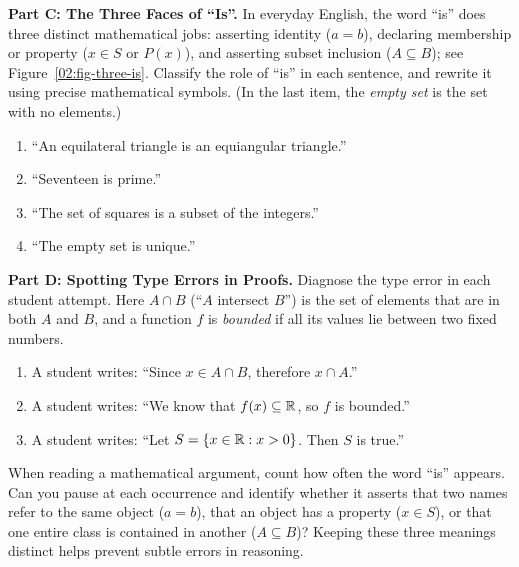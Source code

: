 \textbf{Part C: The Three Faces of ``Is''.} In everyday English, the word ``is'' does three distinct mathematical jobs: asserting identity ($a = b$), declaring membership or property ($x \in S$ or $P(x)$), and asserting subset inclusion ($A \subseteq B$); see Figure~\ref{02:fig-three-is}. Classify the role of ``is'' in each sentence, and rewrite it using precise mathematical symbols. (In the last item, the \emph{empty set} is the set with no elements.)
\begin{enumerate}[resume]
\item ``An equilateral triangle is an equiangular triangle.''
\item ``Seventeen is prime.''
\item ``The set of squares is a subset of the integers.''
\item ``The empty set is unique.''
\end{enumerate}

\textbf{Part D: Spotting Type Errors in Proofs.} Diagnose the type error in each student attempt. Here $A \cap B$ (``$A$ intersect $B$'') is the set of elements that are in both $A$ and $B$, and a function $f$ is \emph{bounded} if all its values lie between two fixed numbers.
\begin{enumerate}[resume]
\item A student writes: ``Since $x \in A \cap B$, therefore $x \cap A$.''
\item A student writes: ``We know that $f(x) \subseteq \mathbb{R}$, so $f$ is bounded.''
\item A student writes: ``Let $S = \{x \in \mathbb{R} : x > 0\}$. Then $S$ is true.''
\end{enumerate}

\begin{walkbox}
When reading a mathematical argument, count how often the word ``is'' appears. Can you pause at each occurrence and identify whether it asserts that two names refer to the same object ($a = b$), that an object has a property ($x \in S$), or that one entire class is contained in another ($A \subseteq B$)? Keeping these three meanings distinct helps prevent subtle errors in reasoning.
\end{walkbox}

\newpage
